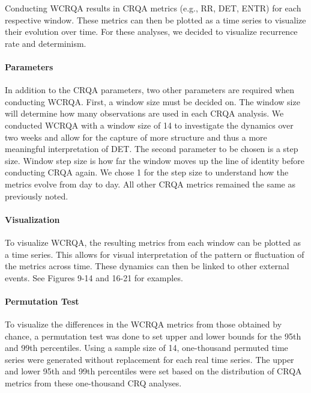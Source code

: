 \documentclass[english,man]{apa6}
\begin{document}
Conducting WCRQA results in CRQA metrics (e.g., RR, DET, ENTR) for each respective window. These metrics can then be plotted as a time series to visualize their evolution over time. For these analyses, we decided to visualize recurrence rate and determinism.

\hypertarget{parameters-1}{%
\paragraph{Parameters}\label{parameters-1}}

In addition to the CRQA parameters, two other parameters are required when conducting WCRQA. First, a window size must be decided on. The window size will determine how many observations are used in each CRQA analysis. We conducted WCRQA with a window size of 14 to investigate the dynamics over two weeks and allow for the capture of more structure and thus a more meaningful interpretation of DET. The second parameter to be chosen is a step size. Window step size is how far the window moves up the line of identity before conducting CRQA again. We chose 1 for the step size to understand how the metrics evolve from day to day. All other CRQA metrics remained the same as previously noted.

\hypertarget{visualization-1}{%
\paragraph{Visualization}\label{visualization-1}}

To visualize WCRQA, the resulting metrics from each window can be plotted as a time series. This allows for visual interpretation of the pattern or fluctuation of the metrics across time. These dynamics can then be linked to other external events. See Figures 9-14 and 16-21 for examples.

\hypertarget{permutation-test-1}{%
\paragraph{Permutation Test}\label{permutation-test-1}}

To visualize the differences in the WCRQA metrics from those obtained by chance, a permutation test was done to set upper and lower bounds for the 95th and 99th percentiles. Using a sample size of 14, one-thousand permuted time series were generated without replacement for each real time series. The upper and lower 95th and 99th percentiles were set based on the distribution of CRQA metrics from these one-thousand CRQ analyses.
\end{document}

